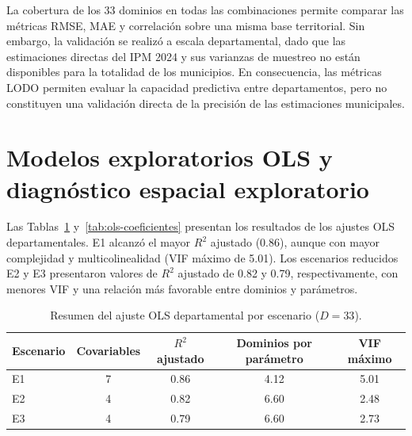 La cobertura de los 33 dominios en todas las combinaciones permite comparar las métricas RMSE, MAE y correlación sobre una misma base territorial. Sin embargo, la validación se realizó a escala departamental, dado que las estimaciones directas del IPM 2024 y sus varianzas de muestreo no están disponibles para la totalidad de los municipios. En consecuencia, las métricas LODO permiten evaluar la capacidad predictiva entre departamentos, pero no constituyen una validación directa de la precisión de las estimaciones municipales.



\section{Modelos exploratorios OLS y diagnóstico espacial exploratorio}
\label{sec:res-ols}

Las Tablas~\ref{tab:ols-resultados} y~\ref{tab:ols-coeficientes} presentan los resultados de los ajustes OLS departamentales. E1 alcanzó el mayor $R^2$ ajustado (0.86), aunque con mayor complejidad y multicolinealidad (VIF máximo de 5.01). Los escenarios reducidos E2 y E3 presentaron valores de $R^2$ ajustado de 0.82 y 0.79, respectivamente, con menores VIF y una relación más favorable entre dominios y parámetros.

\begin{table}[!htbp]
\centering
\small
\caption{Resumen del ajuste OLS departamental por escenario ($D=33$).}
\label{tab:ols-resultados}
\renewcommand{\arraystretch}{1.2}
\begin{tabular}{l c c c c}
\hline
Escenario & Covariables & $R^2$ ajustado & Dominios por parámetro & VIF máximo \\
\hline
E1 & 7 & 0.86 & 4.12 & 5.01 \\
E2 & 4 & 0.82 & 6.60 & 2.48 \\
E3 & 4 & 0.79 & 6.60 & 2.73 \\
\hline
\end{tabular}
\end{table}


